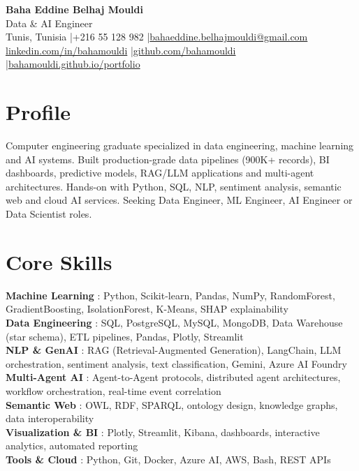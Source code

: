 \documentclass[a4paper,9pt]{article}
\begin{document}
\begin{center}
{\LARGE\bfseries\color{navy} Baha Eddine Belhaj Mouldi}\\[3pt]
{\large Data \& AI Engineer}\\[5pt]
Tunis, Tunisia \quad|\quad +216 55 128 982 \quad|\quad \href{mailto:bahaeddine.belhajmouldi@gmail.com}{bahaeddine.belhajmouldi@gmail.com}\\[1pt]
\href{https://www.linkedin.com/in/bahamouldi}{linkedin.com/in/bahamouldi} \quad|\quad \href{https://github.com/bahamouldi}{github.com/bahamouldi} \quad|\quad \href{https://bahamouldi.github.io/portfolio/}{bahamouldi.github.io/portfolio}
\end{center}
\vspace{1pt}
\section{Profile}
Computer engineering graduate specialized in data engineering, machine learning and AI systems. Built production-grade data pipelines (900K+ records), BI dashboards, predictive models, RAG/LLM applications and multi-agent architectures. Hands-on with Python, SQL, NLP, sentiment analysis, semantic web and cloud AI services. Seeking Data Engineer, ML Engineer, AI Engineer or Data Scientist roles.
\section{Core Skills}
\textbf{Machine Learning} : Python, Scikit-learn, Pandas, NumPy, RandomForest, GradientBoosting, IsolationForest, K-Means, SHAP explainability\\[0.5pt]
\textbf{Data Engineering} : SQL, PostgreSQL, MySQL, MongoDB, Data Warehouse (star schema), ETL pipelines, Pandas, Plotly, Streamlit\\[0.5pt]
\textbf{NLP \& GenAI} : RAG (Retrieval-Augmented Generation), LangChain, LLM orchestration, sentiment analysis, text classification, Gemini, Azure AI Foundry\\[0.5pt]
\textbf{Multi-Agent AI} : Agent-to-Agent protocols, distributed agent architectures, workflow orchestration, real-time event correlation\\[0.5pt]
\textbf{Semantic Web} : OWL, RDF, SPARQL, ontology design, knowledge graphs, data interoperability\\[0.5pt]
\textbf{Visualization \& BI} : Plotly, Streamlit, Kibana, dashboards, interactive analytics, automated reporting\\[0.5pt]
\textbf{Tools \& Cloud} : Python, Git, Docker, Azure AI, AWS, Bash, REST APIs
\end{document}
